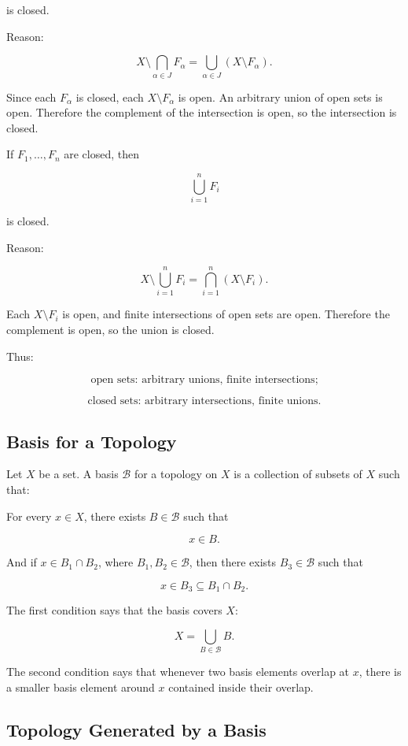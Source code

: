 \documentclass{article}
\begin{document}
	is closed.
	
	Reason:
	
	$$
	X\setminus\bigcap_{\alpha\in J}F_\alpha
	=
	\bigcup_{\alpha\in J}(X\setminus F_\alpha).
	$$
	
	Since each \(F_\alpha\) is closed, each \(X\setminus F_\alpha\) is open. An arbitrary union of open sets is open. Therefore the complement of the intersection is open, so the intersection is closed.
	
	If \(F_1,\ldots,F_n\) are closed, then
	
	$$
	\bigcup_{i=1}^{n}F_i
	$$
	
	is closed.
	
	Reason:
	
	$$
	X\setminus\bigcup_{i=1}^{n}F_i
	=
	\bigcap_{i=1}^{n}(X\setminus F_i).
	$$
	
	Each \(X\setminus F_i\) is open, and finite intersections of open sets are open. Therefore the complement is open, so the union is closed.
	
	Thus:
	
	$$
	\text{open sets: arbitrary unions, finite intersections;}
	$$
	
	$$
	\text{closed sets: arbitrary intersections, finite unions.}
	$$
	
	\subsection{Basis for a Topology}
	
	Let \(X\) be a set. A basis \(\mathcal{B}\) for a topology on \(X\) is a collection of subsets of \(X\) such that:
	
	For every \(x\in X\), there exists \(B\in\mathcal{B}\) such that
	
	$$
	x\in B.
	$$
	
	And if \(x\in B_1\cap B_2\), where \(B_1,B_2\in\mathcal{B}\), then there exists \(B_3\in\mathcal{B}\) such that
	
	$$
	x\in B_3\subseteq B_1\cap B_2.
	$$
	
	The first condition says that the basis covers \(X\):
	
	$$
	X=\bigcup_{B\in\mathcal{B}}B.
	$$
	
	The second condition says that whenever two basis elements overlap at \(x\), there is a smaller basis element around \(x\) contained inside their overlap.
	
	\subsection{Topology Generated by a Basis}
	
\end{document}

